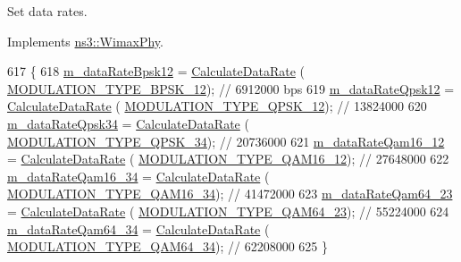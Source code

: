 Set data rates. 



Implements \hyperlink{classns3_1_1WimaxPhy_a87393d9f21a60dc1929aa7a864ffa748}{ns3\+::\+Wimax\+Phy}.


\begin{DoxyCode}
617 \{
618   \hyperlink{classns3_1_1SimpleOfdmWimaxPhy_a6ecf04595f11cd15e531b7a53deaa67c}{m\_dataRateBpsk12} = \hyperlink{classns3_1_1SimpleOfdmWimaxPhy_a7e4fb0a8c4d824c0d40c94699acd6bb5}{CalculateDataRate} (
      \hyperlink{classns3_1_1WimaxPhy_a044c5d8a48ca992c39c2a946f6e755faaef0b78541d9b66d4e85780131e665028}{MODULATION\_TYPE\_BPSK\_12}); \textcolor{comment}{// 6912000 bps}
619   \hyperlink{classns3_1_1SimpleOfdmWimaxPhy_a0d74c7610520530bd62b43c387e1091f}{m\_dataRateQpsk12} = \hyperlink{classns3_1_1SimpleOfdmWimaxPhy_a7e4fb0a8c4d824c0d40c94699acd6bb5}{CalculateDataRate} (
      \hyperlink{classns3_1_1WimaxPhy_a044c5d8a48ca992c39c2a946f6e755faa21f9f78031cd1105c0ff97c9df57de1d}{MODULATION\_TYPE\_QPSK\_12}); \textcolor{comment}{// 13824000}
620   \hyperlink{classns3_1_1SimpleOfdmWimaxPhy_a49cf99dfb3752745fb7d14348312faac}{m\_dataRateQpsk34} = \hyperlink{classns3_1_1SimpleOfdmWimaxPhy_a7e4fb0a8c4d824c0d40c94699acd6bb5}{CalculateDataRate} (
      \hyperlink{classns3_1_1WimaxPhy_a044c5d8a48ca992c39c2a946f6e755faaed15df1f1feb034c0f69dc5e44d05834}{MODULATION\_TYPE\_QPSK\_34}); \textcolor{comment}{// 20736000}
621   \hyperlink{classns3_1_1SimpleOfdmWimaxPhy_aa81cd69942160e28ee5df7d324125b70}{m\_dataRateQam16\_12} = \hyperlink{classns3_1_1SimpleOfdmWimaxPhy_a7e4fb0a8c4d824c0d40c94699acd6bb5}{CalculateDataRate} (
      \hyperlink{classns3_1_1WimaxPhy_a044c5d8a48ca992c39c2a946f6e755faa3b72d83f9fc0c4f964a939a0aa2df5af}{MODULATION\_TYPE\_QAM16\_12}); \textcolor{comment}{// 27648000}
622   \hyperlink{classns3_1_1SimpleOfdmWimaxPhy_a369a57bc52c9826a0e0ef3df5749447c}{m\_dataRateQam16\_34} = \hyperlink{classns3_1_1SimpleOfdmWimaxPhy_a7e4fb0a8c4d824c0d40c94699acd6bb5}{CalculateDataRate} (
      \hyperlink{classns3_1_1WimaxPhy_a044c5d8a48ca992c39c2a946f6e755faa821f09b9921774eb6875b7ec4686ab58}{MODULATION\_TYPE\_QAM16\_34}); \textcolor{comment}{// 41472000}
623   \hyperlink{classns3_1_1SimpleOfdmWimaxPhy_afada894ff462ecd3571c52b0b6ecfaa7}{m\_dataRateQam64\_23} = \hyperlink{classns3_1_1SimpleOfdmWimaxPhy_a7e4fb0a8c4d824c0d40c94699acd6bb5}{CalculateDataRate} (
      \hyperlink{classns3_1_1WimaxPhy_a044c5d8a48ca992c39c2a946f6e755faadc970aa3e5c6c6774cc30daf2c9e176f}{MODULATION\_TYPE\_QAM64\_23}); \textcolor{comment}{// 55224000}
624   \hyperlink{classns3_1_1SimpleOfdmWimaxPhy_a6d82d4887585a80a3617002b9f674a12}{m\_dataRateQam64\_34} = \hyperlink{classns3_1_1SimpleOfdmWimaxPhy_a7e4fb0a8c4d824c0d40c94699acd6bb5}{CalculateDataRate} (
      \hyperlink{classns3_1_1WimaxPhy_a044c5d8a48ca992c39c2a946f6e755faa6d659f22bcedc066aa831271b75734a9}{MODULATION\_TYPE\_QAM64\_34}); \textcolor{comment}{// 62208000}
625 \}
\end{DoxyCode}


